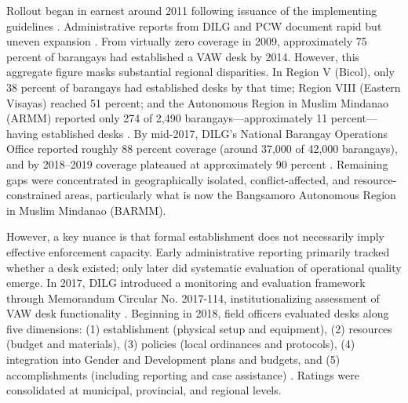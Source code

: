\documentclass[12pt]{article}
\begin{document}
Rollout began in earnest around 2011 following issuance of the implementing guidelines \citep{jmc2010}. Administrative reports from DILG and PCW document rapid but uneven expansion \citep{dilg_nboo_2017, pcw_stats_2019}. From virtually zero coverage in 2009, approximately 75 percent of barangays had established a VAW desk by 2014. However, this aggregate figure masks substantial regional disparities. In Region V (Bicol), only 38 percent of barangays had established desks by that time; Region VIII (Eastern Visayas) reached 51 percent; and the Autonomous Region in Muslim Mindanao (ARMM) reported only 274 of 2,490 barangays—approximately 11 percent—having established desks \citep{dilg_nboo_2017}. By mid-2017, DILG’s National Barangay Operations Office reported roughly 88 percent coverage (around 37,000 of 42,000 barangays), and by 2018–2019 coverage plateaued at approximately 90 percent \citep{pcw_stats_2019}. Remaining gaps were concentrated in geographically isolated, conflict-affected, and resource-constrained areas, particularly what is now the Bangsamoro Autonomous Region in Muslim Mindanao (BARMM).

However, a key nuance is that formal establishment does not necessarily imply effective enforcement capacity. Early administrative reporting primarily tracked whether a desk existed; only later did systematic evaluation of operational quality emerge. In 2017, DILG introduced a monitoring and evaluation framework through Memorandum Circular No. 2017-114, institutionalizing assessment of VAW desk functionality \citep{dilg_mc2017_114}. Beginning in 2018, field officers evaluated desks along five dimensions: (1) establishment (physical setup and equipment), (2) resources (budget and materials), (3) policies (local ordinances and protocols), (4) integration into Gender and Development plans and budgets, and (5) accomplishments (including reporting and case assistance) \citep{dilg_mc2017_114}. Ratings were consolidated at municipal, provincial, and regional levels.
\end{document}
